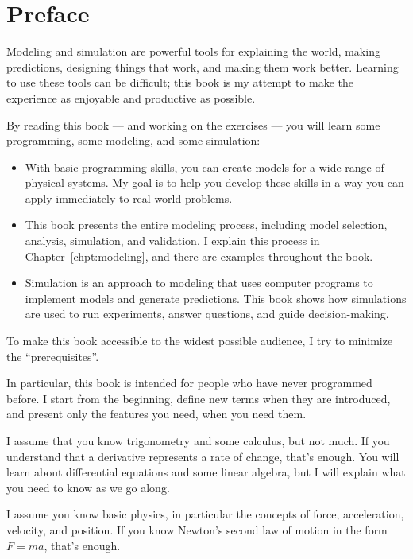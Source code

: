 \documentclass[main.tex]{subfiles}
\begin{document}
\chapter{Preface}

Modeling and simulation are powerful tools for explaining the world, making predictions, designing things that work, and making them work better.  Learning to use these tools can be difficult; this book is my attempt to make the experience as enjoyable and productive as possible.

By reading this book --- and working on the exercises --- you will learn some programming, some modeling, and some simulation:

\begin{itemize}

\item With basic programming skills, you can create models for a wide range of physical systems.
My goal is to help you develop these skills in a way you can apply immediately to real-world problems.

\item This book presents the entire modeling process, including model selection, analysis, simulation, and validation.  I explain this process in Chapter~\ref{chpt:modeling}, and there are examples throughout the book.

\item Simulation is an approach to modeling that uses computer programs to  implement models and generate predictions.  This book shows how simulations are used to run experiments, answer questions, and guide decision-making.

\end{itemize}

To make this book accessible to the widest possible audience, I try to minimize the ``prerequisites''.  

In particular, this book is intended for people who have never programmed before.  I start from the beginning, define new terms when they are introduced, and present only the features you need, when you need them.

I assume that you know trigonometry and some calculus, but not much.  If you understand that a derivative represents a rate of change, that's enough.  You will learn about differential equations and some linear algebra, but I will explain what you need to know as we go along.

I assume you know basic physics, in particular the concepts of force, acceleration, velocity, and position.  If you know Newton's second law of motion in the form $F = m a$, that's enough.
\end{document}
